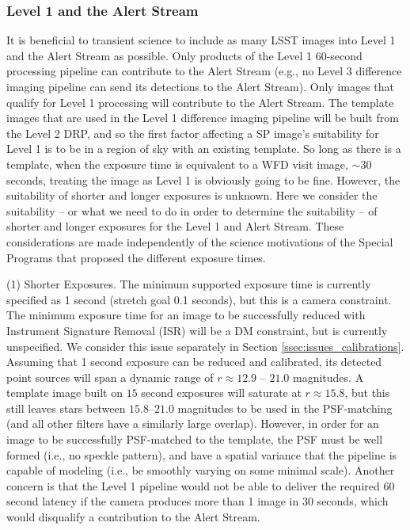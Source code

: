 \documentclass[DM,lsstdraft,toc]{lsstdoc}
\begin{document}
\subsubsection{Level 1 and the Alert Stream}\label{ssec:dmdocs_SPinWFD_L1}

It is beneficial to transient science to include as many LSST images into Level 1 and the Alert Stream as possible. Only products of the Level 1 $60$-second processing pipeline can contribute to the Alert Stream (e.g., no Level 3 difference imaging pipeline can send its detections to the Alert Stream). Only images that qualify for Level 1 processing will contribute to the Alert Stream. The template images that are used in the Level 1 difference imaging pipeline will be built from the Level 2 DRP, and so the first factor affecting a SP image's suitability for Level 1 is to be in a region of sky with an existing template. So long as there is a template, when the exposure time is equivalent to a WFD visit image, $\sim 30$ seconds, treating the image as Level 1 is obviously going to be fine. However, the suitability of shorter and longer exposures is unknown. Here we consider the suitability -- or what we need to do in order to determine the suitability -- of shorter and longer exposures for the Level 1 and Alert Stream. These considerations are made independently of the science motivations of the Special Programs that proposed the different exposure times.


(1) Shorter Exposures. The minimum supported exposure time is currently specified as 1 second (stretch goal 0.1 seconds), but this is a camera constraint. The minimum exposure time for an image to be successfully reduced with Instrument Signature Removal (ISR) will be a DM constraint, but is currently unspecified. We consider this issue separately in Section \ref{ssec:issues_calibrations}. Assuming that 1 second exposure can be reduced and calibrated, its detected point sources will span a dynamic range of $r \approx 12.9$ -- $21.0$ magnitudes. A template image built on $15$ second exposures will saturate at $r \approx 15.8$, but this still leaves stars between $15.8$--$21.0$ magnitudes to be used in the PSF-matching (and all other filters have a similarly large overlap). However, in order for an image to be successfully PSF-matched to the template, the PSF must be well formed (i.e., no speckle pattern), and have a spatial variance that the pipeline is capable of modeling (i.e., be smoothly varying on some minimal scale).  Another concern is that the Level 1 pipeline would not be able to deliver the required $60$ second latency if the camera produces more than 1 image in 30 seconds, which would disqualify a contribution to the Alert Stream.
\end{document}
